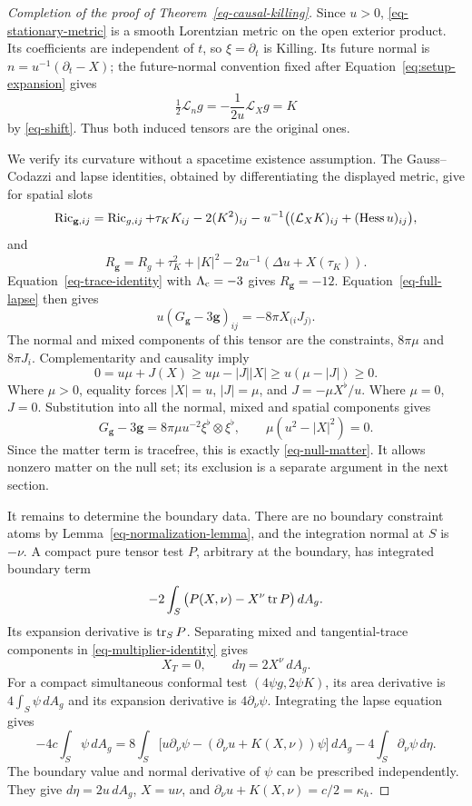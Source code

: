 \begin{proof}[Completion of the proof of Theorem~\ref{eq-causal-killing}]
Since \(u>0\), \eqref{eq-stationary-metric} is a smooth Lorentzian
metric on the open exterior product.  Its coefficients are independent
of \(t\), so \(\xi=\partial_t\) is Killing.  Its future normal is
\(n=u^{-1}(\partial_t-X)\); the future-normal convention fixed after
Equation~\eqref{eq:setup-expansion} gives
\[
 \tfrac12\mathcal L_n g=-\frac1{2u}\mathcal L_Xg=K
\]
by \eqref{eq-shift}.  Thus both induced tensors are the original ones.

We verify its curvature without a spacetime existence assumption.
The Gauss--Codazzi and lapse identities, obtained by differentiating
the displayed metric, give for spatial slots
\[
 \operatorname{Ric}_{\mathbf g,ij}
 =\operatorname{Ric}_{g,ij}+\tau_KK_{ij}-2(K^2)_{ij}
       -u^{-1}\big((\mathcal L_XK)_{ij}+(\operatorname{Hess} u)_{ij}\big),
\]
and
\[
 R_{\mathbf g}=R_g+\tau_K^2+|K|^2
                     -2u^{-1}(\Delta u+X(\tau_K)).
\]
Equation~\eqref{eq-trace-identity} with
\(\Lambda_{\rm c}=-3\) gives \(R_{\mathbf g}=-12\).
Equation~\eqref{eq-full-lapse} then gives
\[
 u(G_{\mathbf g}-3\mathbf g)_{ij}=-8\pi X_{(i}J_{j)}.
\]
The normal and mixed components of this tensor are the constraints,
\(8\pi\mu\) and \(8\pi J_i\).
Complementarity and causality imply
\[
 0=u\mu+J(X)\geq u\mu-|J||X|
                \geq u(\mu-|J|)\geq0.
\]
Where \(\mu>0\), equality forces
\(|X|=u\), \(|J|=\mu\), and \(J=-\mu X^\flat/u\).
Where \(\mu=0\), \(J=0\).
Substitution into all the normal, mixed and spatial components gives
\[
 G_{\mathbf g}-3\mathbf g
      =8\pi\mu u^{-2}\xi^\flat\otimes\xi^\flat,\qquad
 \mu(u^2-|X|^2)=0.
\]
Since the matter term is tracefree, this is exactly
\eqref{eq-null-matter}.  It allows nonzero matter on the null set;
its exclusion is a separate argument in the next section.

It remains to determine the boundary data.  There are no boundary
constraint atoms by Lemma~\ref{eq-normalization-lemma}, and the
integration normal at \(S\) is \(-\nu\).  A compact pure tensor test
\(P\), arbitrary at the boundary, has integrated boundary term
\[
 -2\int_S\big(P(X,\nu)-X^\nu\operatorname{tr} P\big)\,dA_g.
\]
Its expansion derivative is \(\operatorname{tr}_SP\).
Separating mixed and tangential-trace components in
\eqref{eq-multiplier-identity} gives
\[
 X_T=0,\qquad d\eta=2X^\nu\,dA_g.
\]
For a compact simultaneous conformal test
\((4\psi g,2\psi K)\), its area derivative is
\(4\int_S\psi\,dA_g\) and its expansion derivative is
\(4\partial_\nu\psi\).  Integrating the lapse equation gives
\[
 -4c\int_S\psi\,dA_g
 =8\int_S\big[u\partial_\nu\psi
        -(\partial_\nu u+K(X,\nu))\psi\big]\,dA_g
       -4\int_S\partial_\nu\psi\,d\eta .
\]
The boundary value and normal derivative of \(\psi\) can be
prescribed independently.  They give
\(d\eta=2u\,dA_g\), \(X=u\nu\), and
\(\partial_\nu u+K(X,\nu)=c/2=\kappa_h\).


\end{proof}
